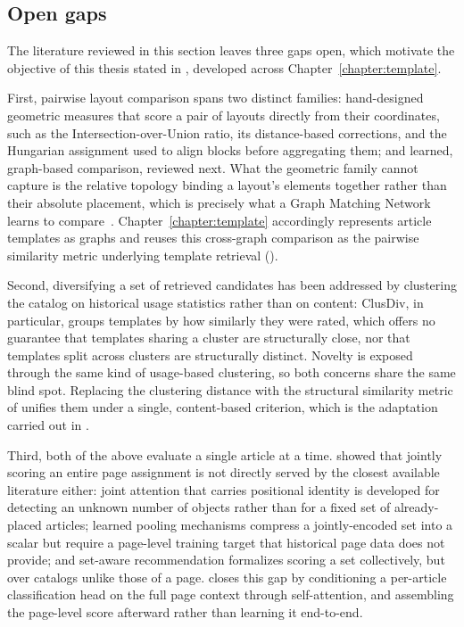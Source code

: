 \subsection{Open gaps}
\label{sec:sota-retrieval-gaps}

The literature reviewed in this section leaves three gaps open, which motivate the objective of this thesis stated in , developed across Chapter~\ref{chapter:template}.

First, pairwise layout comparison spans two distinct families: hand-designed geometric measures that score a pair of layouts directly from their coordinates, such as the Intersection-over-Union ratio, its distance-based corrections, and the Hungarian assignment used to align blocks before aggregating them; and learned, graph-based comparison, reviewed next. What the geometric family cannot capture is the relative topology binding a layout's elements together rather than their absolute placement, which is precisely what a Graph Matching Network learns to compare~\cite{li-gmn-2019, patil_layoutgmn_2021}. Chapter~\ref{chapter:template} accordingly represents article templates as graphs and reuses this cross-graph comparison as the pairwise similarity metric underlying template retrieval ().

Second, diversifying a set of retrieved candidates has been addressed by clustering the catalog on historical usage statistics rather than on content: ClusDiv, in particular, groups templates by how similarly they were rated, which offers no guarantee that templates sharing a cluster are structurally close, nor that templates split across clusters are structurally distinct. Novelty is exposed through the same kind of usage-based clustering, so both concerns share the same blind spot. Replacing the clustering distance with the structural similarity metric of  unifies them under a single, content-based criterion, which is the adaptation carried out in .

Third, both of the above evaluate a single article at a time.  showed that jointly scoring an entire page assignment is not directly served by the closest available literature either: joint attention that carries positional identity is developed for detecting an unknown number of objects rather than for a fixed set of already-placed articles; learned pooling mechanisms compress a jointly-encoded set into a scalar but require a page-level training target that historical page data does not provide; and set-aware recommendation formalizes scoring a set collectively, but over catalogs unlike those of a page.  closes this gap by conditioning a per-article classification head on the full page context through self-attention, and assembling the page-level score afterward rather than learning it end-to-end.


